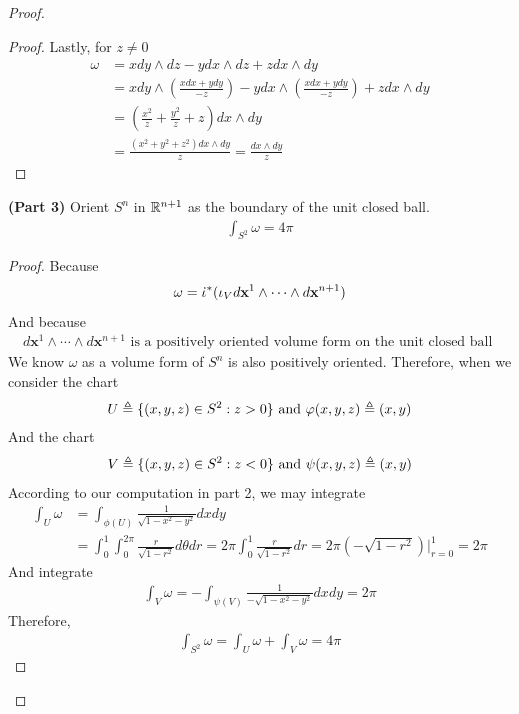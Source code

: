 \documentclass{report}
\begin{document}
\begin{proof}
\begin{proof}
Lastly, for $z\neq 0$ 
\begin{align*}
\omega&=   xdy \wedge dz- ydx\wedge  dz + zdx \wedge  dy      \\
&= xdy\wedge  (\frac{xdx+ydy}{-z}) -ydx \wedge   (\frac{xdx+ydy}{-z})  + z dx\wedge  dy  \\
&= (\frac{x^2}{z}+ \frac{y^2}{z}+ z)dx \wedge  dy \\
&=\frac{(x^2+y^2+z^2)dx\wedge  dy }{z}= \frac{dx \wedge  dy }{z} 
\end{align*}
\end{proof}
\begin{theorem}
\textbf{(Part 3)} Orient $S^n$ in  $\mathbb{R}^{n+1}$ as the boundary of the unit closed ball. 
\begin{align*}
\int_{S^2}\omega =4\pi  
\end{align*}
\end{theorem}
\begin{proof}
Because 
\begin{align*} 
\omega = \dot{\iota}^*(\iota_V d\textbf{x}^1 \wedge  \cdots \wedge  d\textbf{x}^{n+1}   )   
\end{align*}
And because  
\begin{align*}
d\textbf{x}^1 \wedge  \cdots \wedge  d \textbf{x}^{n+1}   \text{ is a positively oriented volume form on the unit closed ball }
\end{align*}
We know $\omega$ as a volume form of $S^n$ is also positively oriented. Therefore, when we consider the chart  
\begin{align*}
U \triangleq \{ (x,y,z)\in S^2:z>0 \}\text{ and } \varphi(x,y,z)\triangleq (x,y)
\end{align*}
And the chart 
\begin{align*}
V\triangleq \{ (x,y,z)\in S^2 :z<0 \}\text{ and }\psi (x,y,z)\triangleq (x,y)
\end{align*}
According to our computation in part 2, we may integrate  
\begin{align*}
\int_U \omega&= \int_{\phi (U)} \frac{1}{\sqrt{1-x^2-y^2} }dxdy \\
&=\int_{0}^1 \int_{0}^{2\pi } \frac{r}{\sqrt{1-r^2} }d\theta dr=2\pi  \int_{0}^1 \frac{r}{\sqrt{1-r^2} }dr= 2\pi  (-\sqrt{1-r^2} )\Big|_{r=0}^1=2\pi 
\end{align*}
And integrate 
\begin{align*}
\int_V \omega= -\int_{\psi (V)} \frac{1}{-\sqrt{1-x^2-y^2} }dxdy= 2\pi 
\end{align*}
Therefore, 
\begin{align*}
\int_{S^2}\omega= \int_U \omega + \int_V \omega = 4\pi 
\end{align*}


\end{proof}
\end{proof}
\end{document}
